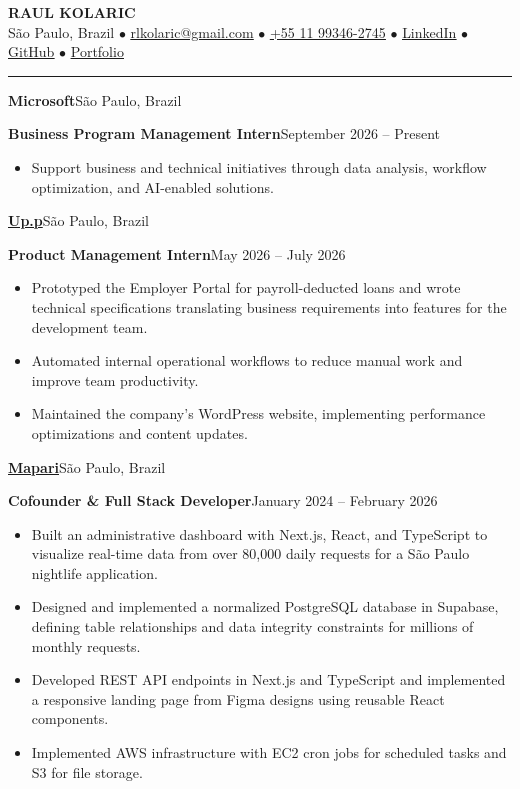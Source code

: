 \documentclass[10pt,letterpaper]{article}
\newcommand{\ressection}[1]{\par\vspace{6pt}{\large\bfseries #1}\par\vspace{2pt}\hrule\vspace{3pt}}
\newcommand{\role}[4]{\textbf{#1}\hfill #2\par\textbf{#3}\hfill #4\par}
\begin{document}
\begin{center}
{\LARGE\bfseries RAUL KOLARIC}\\[3pt]
{\small São Paulo, Brazil $\bullet$
\href{mailto:rlkolaric@gmail.com}{\underline{rlkolaric@gmail.com}} $\bullet$
\href{tel:+5511993462745}{\underline{+55 11 99346-2745}} $\bullet$
\href{https://www.linkedin.com/in/raulkolaric/}{\underline{LinkedIn}} $\bullet$
\href{https://github.com/raulkolaric}{\underline{GitHub}} $\bullet$
\href{https://rkolaric.com/}{\underline{Portfolio}}}
\end{center}
\vspace{-7pt}
\ressection{Experience}
\role{Microsoft}{São Paulo, Brazil}{Business Program Management Intern}{September 2026 -- Present}
\begin{itemize}
\item Support business and technical initiatives through data analysis, workflow optimization, and AI-enabled solutions.
\end{itemize}
\vspace{3pt}
\role{\href{https://upp.com.br/}{Up.p}}{São Paulo, Brazil}{Product Management Intern}{May 2026 -- July 2026}
\begin{itemize}
\item Prototyped the Employer Portal for payroll-deducted loans and wrote technical specifications translating business requirements into features for the development team.
\item Automated internal operational workflows to reduce manual work and improve team productivity.
\item Maintained the company's WordPress website, implementing performance optimizations and content updates.
\end{itemize}
\vspace{3pt}
\role{\href{https://mapari.app/}{Mapari}}{São Paulo, Brazil}{Cofounder \& Full Stack Developer}{January 2024 -- February 2026}
\begin{itemize}
\item Built an administrative dashboard with Next.js, React, and TypeScript to visualize real-time data from over 80,000 daily requests for a São Paulo nightlife application.
\item Designed and implemented a normalized PostgreSQL database in Supabase, defining table relationships and data integrity constraints for millions of monthly requests.
\item Developed REST API endpoints in Next.js and TypeScript and implemented a responsive landing page from Figma designs using reusable React components.
\item Implemented AWS infrastructure with EC2 cron jobs for scheduled tasks and S3 for file storage.
\end{itemize}
\end{document}
